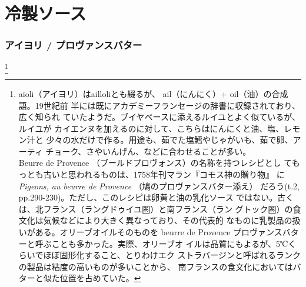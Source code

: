 \hypertarget{ux51b7ux88fdux30bdux30fcux30b9}{%
\section{冷製ソース}\label{ux51b7ux88fdux30bdux30fcux30b9}}


\begin{recette}
\hypertarget{sauce-aioli}{%
\subsubsection{アイヨリ / プロヴァンスバター}\label{sauce-aioli}}

\footnote{aïoli（アイヨリ）はailloliとも綴るが、
  ail（にんにく）+ oil（油）の合成語。19世紀前
  半には既にアカデミーフランセージの辞書に収録されており、広く知られ
  ていたようだ。ブイヤベースに添えるルイユとよく似ているが、ルイユが
  カイエンヌを加えるのに対して、こちらはにんにくと油、塩、レモン汁と
  少々の水だけで作る。用途も、茹でた塩鱈やじゃがいも、茹で卵、アーティ
  チョーク、さやいんげん、などに合わせることが多い。\\
  Beurre de Provence （ブールドプロヴォンス）の名称を持つレシピとし
  てもっとも古いと思われるものは、1758年刊マラン『コモス神の贈り物』 に
  \emph{Pigeons, au beurre de Provence} （鳩のプロヴァンスバター添え）
  だろう(t.2, pp.290-230)。ただし、このレシピは卵黄と油の乳化ソース
  ではない。古くは、北フランス（ラングドゥイユ圏）と南フランス（ラン
  グトック圏）の食文化は気候などにより大きく異なっており、その代表的
  なものに乳製品の扱いがある。オリーブオイルそのものを beurre de
  Provence プロヴァンスバターと呼ぶことも多かった。実際、オリーブオ
  イルは品質にもよるが、5℃くらいでほぼ固形化すること、とりわけエク
  ストラバージンと呼ばれるランクの製品は粘度の高いものが多いことから、
  南フランスの食文化においてはバターと似た位置を占めていた。}



\end{recette}
